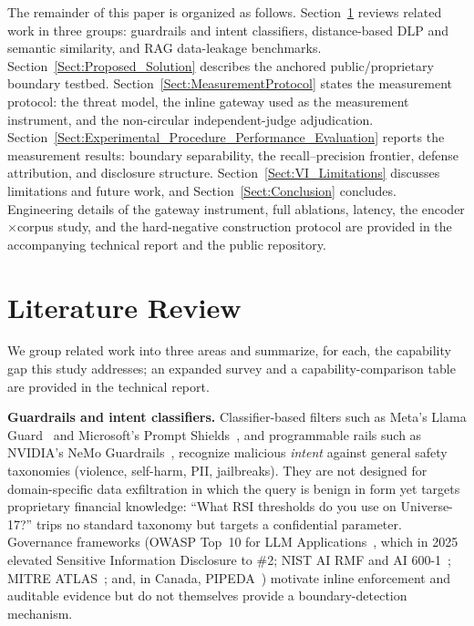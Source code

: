 \documentclass[journal]{IEEEtran}
\begin{document}
The remainder of this paper is organized as follows. Section~\ref{Sect:Literature_Review} reviews related work in three groups: guardrails and intent classifiers, distance-based DLP and semantic similarity, and RAG data-leakage benchmarks. Section~\ref{Sect:Proposed_Solution} describes the anchored public/proprietary boundary testbed. Section~\ref{Sect:MeasurementProtocol} states the measurement protocol: the threat model, the inline gateway used as the measurement instrument, and the non-circular independent-judge adjudication. Section~\ref{Sect:Experimental_Procedure_Performance_Evaluation} reports the measurement results: boundary separability, the recall--precision frontier, defense attribution, and disclosure structure. Section~\ref{Sect:VI_Limitations} discusses limitations and future work, and Section~\ref{Sect:Conclusion} concludes. Engineering details of the gateway instrument, full ablations, latency, the encoder$\times$corpus study, and the hard-negative construction protocol are provided in the accompanying technical report and the public repository.

\section{Literature Review}
\label{Sect:Literature_Review}
%

We group related work into three areas and summarize, for each, the capability gap this study addresses; an expanded survey and a capability-comparison table are provided in the technical report.

\textbf{Guardrails and intent classifiers.} Classifier-based filters such as Meta's Llama Guard~\cite{llama_guard} and Microsoft's Prompt Shields~\cite{ms_prompt_shields}, and programmable rails such as NVIDIA's NeMo Guardrails~\cite{nemo_guardrails}, recognize malicious \textit{intent} against general safety taxonomies (violence, self-harm, PII, jailbreaks). They are not designed for domain-specific data exfiltration in which the query is benign in form yet targets proprietary financial knowledge: ``What RSI thresholds do you use on Universe-17?'' trips no standard taxonomy but targets a confidential parameter. Governance frameworks (OWASP Top~10 for LLM Applications~\cite{owasp_llm_2025}, which in 2025 elevated Sensitive Information Disclosure to \#2; NIST AI RMF and AI 600-1~\cite{nist_ai_rmf, nist_ai_600_1}; MITRE ATLAS~\cite{mitre_atlas}; and, in Canada, PIPEDA~\cite{pipeda_guidance}) motivate inline enforcement and auditable evidence but do not themselves provide a boundary-detection mechanism.
\end{document}
